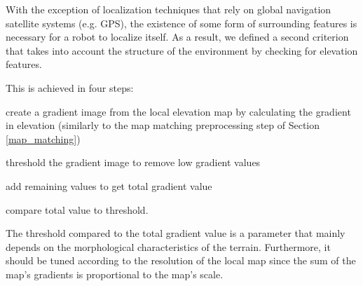 With the exception of localization techniques that rely on global navigation
satellite systems (e.g. GPS), the existence of some form of surrounding
features is necessary for a robot to localize itself.
As a result, we defined a second criterion that takes into account
the structure of the environment by checking for elevation features.

This is achieved in four steps:
\begin{enumerate*}[label=(\roman*)]
    \item create a gradient image from the local elevation map by calculating
        the gradient in elevation (similarly to the map matching preprocessing
        step of Section \ref{map_matching})
    \item threshold the gradient image to remove low gradient values
    \item add remaining values to get total gradient value
    \item compare total value to threshold.
\end{enumerate*}

The threshold compared to the total gradient value is a parameter that mainly
depends on the morphological characteristics of the terrain.
Furthermore, it should be tuned according to the resolution of the local
map since the sum of the map's gradients is proportional to the map's scale.

